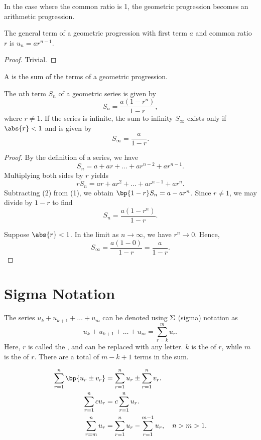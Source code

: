 In the case where the common ratio is 1, the geometric progression becomes an arithmetic progression.

\begin{proposition}
    The general term of a geometric progression with first term $a$ and common ratio $r$ is $u_n = a r^{n-1}$.
\end{proposition}
\begin{proof}
    Trivial.
\end{proof}

\begin{definition}
    A  is the sum of the terms of a geometric progression.
\end{definition}

\begin{proposition}
    The $n$th term $S_n$ of a geometric series is given by \[S_n = \frac{a(1 - r^n)}{1 - r},\] where $r \neq 1$. If the series is infinite, the sum to infinity $S_\infty$ exists only if $\abs{r} < 1$ and is given by \[S_\infty = \frac{a}{1 - r}.\]
\end{proposition}
\begin{proof}
    By the definition of a series, we have \[S_n = a + ar + \dots + ar^{n-2} + ar^{n-1}. \tag{1}\] Multiplying both sides by $r$ yields \[r S_n = ar + ar^2 + \dots + ar^{n-1} + ar^{n}. \tag{2}\] Subtracting (2) from (1), we obtain $\bp{1-r}S_n = a - ar^{n}$. Since $r \neq 1$, we may divide by $1-r$ to find \[S_n = \frac{a(1 - r^{n})}{1 - r}.\]
    
    Suppose $\abs{r} < 1$. In the limit as $n \to \infty$, we have $r^n \to 0$. Hence, \[S_\infty = \frac{a(1 - 0)}{1 - r} = \frac{a}{1-r}.\]
\end{proof}

\section{Sigma Notation}

\begin{definition}
    The series $u_k + u_{k+1} + \dots + u_m$ can be denoted using $\S$ (sigma) notation as \[u_k + u_{k+1} + \dots + u_m = \sum_{r=k}^m u_r.\] Here, $r$ is called the , and can be replaced with any letter. $k$ is the  of $r$, while $m$ is the  of $r$. There are a total of $m - k + 1$ terms in the sum.
\end{definition}

\begin{fact}
    \begin{align*}
        \sum_{r = 1}^n \bp{u_r \pm v_r} &= \sum_{r = 1}^n u_r \pm \sum_{r = 1}^n v_r.\\
        \sum_{r = 1}^n cu_r &= c\sum_{r = 1}^n u_r.\\
        \sum_{r = m}^n u_r &= \sum_{r = 1}^n u_r - \sum_{r = 1}^{m-1} u_r, \quad n > m > 1.
    \end{align*}
\end{fact}

